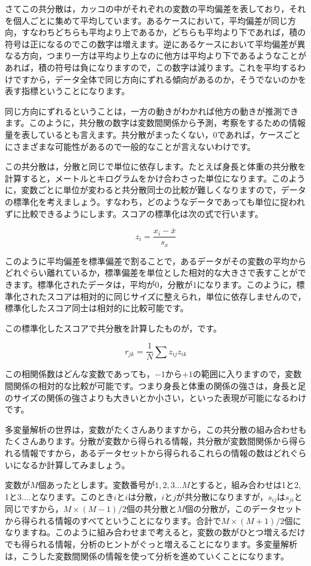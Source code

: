 \documentclass{ltjsbook}
\begin{document}
さてこの共分散は，カッコの中がそれぞれの変数の平均偏差を表しており，それを個人ごとに集めて平均しています。あるケースにおいて，平均偏差が同じ方向，すなわちどちらも平均より上であるか，どちらも平均より下であれば，積の符号は正になるのでこの数字は増えます。逆にあるケースにおいて平均偏差が異なる方向，つまり一方は平均より上なのに他方は平均より下であるようなことがあれば，積の符号は負になりますので，この数字は減ります。これを平均するわけですから，データ全体で同じ方向にずれる傾向があるのか，そうでないのかを表す指標ということになります。

同じ方向にずれるということは，一方の動きがわかれば他方の動きが推測できます。このように，共分散の数字は変数間関係から予測，考察をするための情報量を表しているとも言えます。共分散がまったくない，0であれば，ケースごとにさまざまな可能性があるので一般的なことが言えないわけです。

この共分散は，分散と同じで単位に依存します。たとえば身長と体重の共分散を計算すると，メートルとキログラムをかけ合わさった単位になります。このように，変数ごとに単位が変わると共分散同士の比較が難しくなりますので，データの標準化を考えましょう。すなわち，どのようなデータであっても単位に捉われずに比較できるようにします。スコアの標準化は次の式で行います。

\[ z_i = \frac{x_i - \bar{x}}{s_x} \]

このように平均偏差を標準偏差で割ることで，あるデータがその変数の平均からどれぐらい離れているか，標準偏差を単位とした相対的な大きさで表すことができます。標準化されたデータは，平均が$0$，分散が$1$になります。このように，標準化されたスコアは相対的に同じサイズに整えられ，単位に依存しませんので，標準化したスコア同士は相対的に比較可能です。

この標準化したスコアで共分散を計算したものが，です。

\[ r_{jk} = \frac{1}{N} \sum z_{ij} z_{ik} \]

この相関係数はどんな変数であっても，$-1$から$+1$の範囲に入りますので，変数間関係の相対的な比較が可能です。つまり身長と体重の関係の強さは，身長と足のサイズの関係の強さよりも大きいとか小さい，といった表現が可能になるわけです。

多変量解析の世界は，変数がたくさんありますから，この共分散の組み合わせもたくさんあります。分散が変数から得られる情報，共分散が変数間関係から得られる情報ですから，あるデータセットから得られるこれらの情報の数はどれぐらいになるか計算してみましょう。

変数が$M$個あったとします。変数番号が$1,2,3...M$とすると，組み合わせは1と2, 1と3....となります。このとき$i$と$i$は分散，$i$と$j$が共分散になりますが，$s_{ij}$は$s_{ji}$と同じですから，$M \times (M-1) /2$個の共分散と$M$個の分散が，このデータセットから得られる情報のすべてということになります。合計で$M \times (M+1) /2 $個になりますね。このように組み合わせまで考えると，変数の数がひとつ増えるだけでも得られる情報，分析のヒントがぐっと増えることになります。多変量解析は，こうした変数間関係の情報を使って分析を進めていくことになります。
\end{document}
